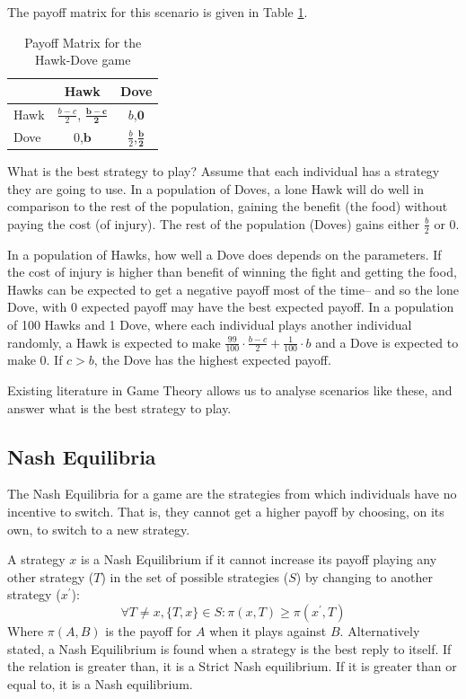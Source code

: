\documentclass[a4paper,11pt,bcshonoursthesis,singlespace,twoside,thesisdraft,pdflatex]{cssethesis}
\begin{document}
The payoff matrix for this scenario is given in Table \ref{table:payoffHD}.
\begin{table}[h]\centering
\captionsetup{justification=centering}
\begin{tabular}{|l|c|c|}
\hline
 & \bf{Hawk} & \bf{Dove}\\
\hline
Hawk & $\frac{{b}-{c}}{2}$, {$\boldsymbol{\frac{{b}-{c}}{2}}$} & $b$,$\boldsymbol{0}$\\
\hline
Dove & $0$,$\boldsymbol{b}$ & $\frac{b}{2}$,$\boldsymbol{\frac{b}{2}}$ \\
\hline
\end{tabular}
\caption{Payoff Matrix for the Hawk-Dove game}
\label{table:payoffHD}
\end{table}

What is the best strategy to play? 
Assume that each individual has a strategy they are going to use. 
In a population of Doves, a lone Hawk will do well in comparison to the rest of the population, gaining the benefit (the food) without paying the cost (of injury). 
The rest of the population (Doves) gains either $\frac{b}{2}$ or $0$. 

In a population of Hawks, how well a Dove does depends on the parameters. 
If the cost of injury is higher than benefit of winning the fight and getting the food, Hawks can be expected to get a negative payoff most of the time-- and so the lone Dove, with $0$ expected payoff may have the best expected payoff. In a population of 100 Hawks and 1 Dove, where each individual plays another individual randomly, a Hawk is expected to make $\frac{99}{100}\cdot\frac{b-c}{2}+\frac{1}{100}\cdot b$ and a Dove is expected to make $0$. If $c>b$, the Dove has the highest expected payoff. 

Existing literature in Game Theory allows us to analyse scenarios like these, and answer what is the best strategy to play.
\subsection{Nash Equilibria}
The Nash Equilibria for a game are the strategies from which individuals have no incentive to switch. 
That is, they cannot get a higher payoff by choosing, on its own, to switch to a new strategy.  

A strategy $x$ is a Nash Equilibrium if it cannot increase its payoff playing any other strategy ($T$) in the set of possible strategies ($S$) by changing to another strategy ($x^\prime$):
\begin{equation}
\forall T \neq x, \{T,x\} \in S: \pi(x,T)\geq \pi(x^\prime,T)
\end{equation}
Where $\pi(A,B)$ is the payoff for $A$ when it plays against $B$. 
Alternatively stated, a Nash Equilibrium is found when a strategy is the best reply to itself. 
If the relation is greater than, it is a Strict Nash equilibrium. 
If it is greater than or equal to, it is a Nash equilibrium.
\end{document}
